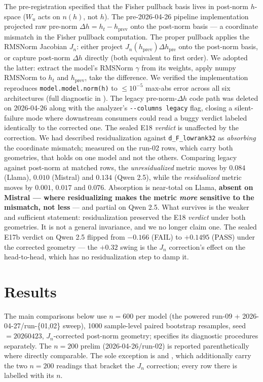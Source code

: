 \documentclass[10pt, letterpaper]{article}
\renewcommand{\dh}{\Delta h}
\newcommand{\Wu}{W_u}
\newcommand{\Jn}{J_n}
\begin{document}
The pre-registration specified that the Fisher pullback basis lives in
post-norm $h$-space ($\Wu$ acts on $n(h)$, not $h$). The pre-2026-04-26
pipeline implementation projected raw pre-norm $\dh = h_t -
h_{\text{prev}}$ onto the post-norm basis --- a coordinate mismatch in
the Fisher pullback computation. The proper pullback applies the
RMSNorm Jacobian $\Jn$: either project $\Jn(h_{\text{prev}})
\dh_{\text{pre}}$ onto the post-norm basis, or capture post-norm
$\dh$ directly (both equivalent to first order). We adopted the latter:
extract the model's RMSNorm $\gamma$ from its weights, apply numpy
RMSNorm to $h_t$ and $h_{\text{prev}}$, take the difference. We
verified the implementation reproduces \texttt{model.model.norm(h)} to
$\leq 10^{-5}$ max-abs error across all six architectures (full
diagnostic in ). The legacy pre-norm-$\dh$ code path
was deleted on 2026-04-26 along with the analyzer's
\texttt{-{}-columns legacy} flag, closing a silent-failure mode where
downstream consumers could read a buggy verdict labeled identically
to the corrected one. The sealed E18 \emph{verdict} is unaffected by
the correction. We had described residualization against
\texttt{d\_F\_lowrank32} as \emph{absorbing} the coordinate mismatch;
measured on the run-02 rows, which carry both geometries, that holds on
one model and not the others. Comparing legacy against post-norm at
matched rows, the \emph{unresidualized} metric moves by $0.084$
(Llama), $0.010$ (Mistral) and $0.134$ (Qwen 2.5), while the
\emph{residualized} metric moves by $0.001$, $0.017$ and $0.076$.
Absorption is near-total on Llama, \textbf{absent on Mistral --- where
residualizing makes the metric \emph{more} sensitive to the mismatch,
not less} --- and partial on Qwen 2.5. What survives is the weaker and
sufficient statement: residualization preserved the E18 \emph{verdict}
under both geometries. It is not a general invariance, and we no longer
claim one. The
sealed E17b verdict on Qwen 2.5 flipped from $-0.166$ (FAIL) to
$+0.1495$ (PASS) under the corrected geometry --- the $+0.32$ swing is
the $\Jn$ correction's effect on the head-to-head, which has no
residualization step to damp it.

\section{Results}
\label{sec:results}

The main comparisons below use $n=600$ per model (the powered run-09 +
2026-04-27/run-\{01,02\} sweep), 1000 sample-level paired bootstrap
resamples, seed $= 20260423$, $\Jn$-corrected post-norm geometry;
 specifies its diagnostic procedures separately. The
$n=200$ prelim (2026-04-26/run-02) is reported parenthetically where
directly comparable. The sole exception is  and
, which additionally carry the two $n=200$ readings that
bracket the $\Jn$ correction; every row there is labelled with its $n$.
\end{document}
